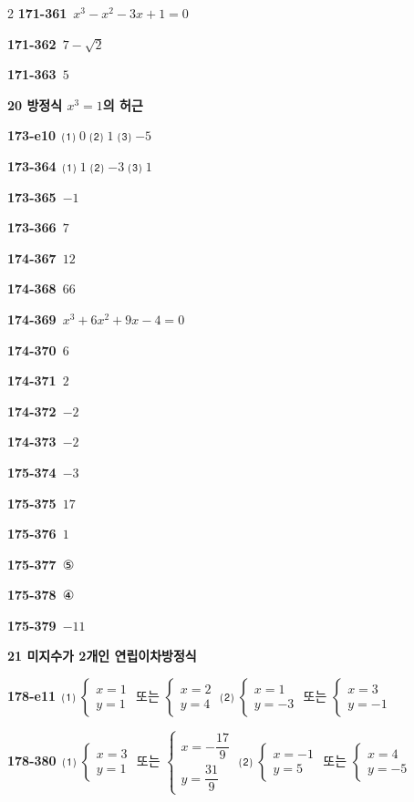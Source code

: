 \documentclass[10pt,a4paper]{article}
\begin{document}
\begin{multicols}{2}
\noindent\textbf{171-361}\ $x^3-x^2-3x+1=0$\par
\noindent\textbf{171-362}\ $7-\sqrt{2}$\par
\noindent\textbf{171-363}\ $5$\par
\noindent\textbf{20 방정식 $x^3=1$의 허근}\par\smallskip
\noindent\textbf{173-e10}\ ⑴ $0$ ⑵ $1$ ⑶ $-5$\par
\noindent\textbf{173-364}\ ⑴ $1$ ⑵ $-3$ ⑶ $1$\par
\noindent\textbf{173-365}\ $-1$\par
\noindent\textbf{173-366}\ $7$\par
\noindent\textbf{174-367}\ $12$\par
\noindent\textbf{174-368}\ $66$\par
\noindent\textbf{174-369}\ $x^3+6x^2+9x-4=0$\par
\noindent\textbf{174-370}\ $6$\par
\noindent\textbf{174-371}\ $2$\par
\noindent\textbf{174-372}\ $-2$\par
\noindent\textbf{174-373}\ $-2$\par
\noindent\textbf{175-374}\ $-3$\par
\noindent\textbf{175-375}\ $17$\par
\noindent\textbf{175-376}\ $1$\par
\noindent\textbf{175-377}\ ⑤\par
\noindent\textbf{175-378}\ ④\par
\noindent\textbf{175-379}\ $-11$\par
\noindent\textbf{21 미지수가 2개인 연립이차방정식}\par\smallskip
\noindent\textbf{178-e11}\ ⑴ $\begin{cases} x=1 \\ y=1 \end{cases}$ 또는 $\begin{cases} x=2 \\ y=4 \end{cases}$ \quad ⑵ $\begin{cases} x=1 \\ y=-3 \end{cases}$ 또는 $\begin{cases} x=3 \\ y=-1 \end{cases}$\par
\noindent\textbf{178-380}\ ⑴ $\begin{cases} x=3 \\ y=1 \end{cases}$ 또는 $\begin{cases} x=-\dfrac{17}{9} \\[4pt] y=\dfrac{31}{9} \end{cases}$ \quad ⑵ $\begin{cases} x=-1 \\ y=5 \end{cases}$ 또는 $\begin{cases} x=4 \\ y=-5 \end{cases}$\par

\end{multicols}
\end{document}
